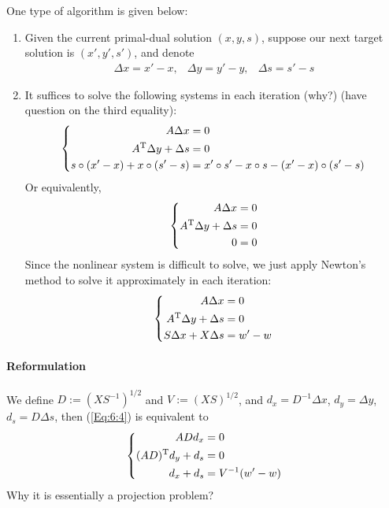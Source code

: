 One type of algorithm is given below:
\begin{enumerate}
\item
Given the current primal-dual solution $(x,y,s)$, suppose our next target solution is $(x',y',s')$, and denote
\[
\begin{array}{lll}
\Delta x=x'-x,
&
\Delta y = y'-y,
&
\Delta s = s'-s
\end{array}
\]
\item
It suffices to solve the following systems in each iteration (why?) (have question on the third equality):
\begin{equation}\label{Eq:6:4}
\begin{aligned}
\left\{
\begin{aligned}
A\Delta x&=0\\
A^{\mathrm T}\Delta y+\Delta s&=0\\
s\circ(x'-x)+x\circ(s'-s)&=x'\circ s' - x\circ s - (x'-x)\circ(s'-s)
\end{aligned}
\right.
\end{aligned}
\end{equation}
Or equivalently,
\begin{equation}
\begin{aligned}
\left\{
\begin{aligned}
A\Delta x&=0\\
A^{\mathrm T}\Delta y+\Delta s&=0\\
0&= 0
\end{aligned}
\right.
\end{aligned}
\end{equation}
Since the nonlinear system is difficult to solve, we just apply Newton's method to solve it approximately in each iteration:
\begin{equation}\label{Eq:6:4}
\begin{aligned}
\left\{
\begin{aligned}
A\Delta x&=0\\
A^{\mathrm T}\Delta y+\Delta s&=0\\
S\Delta x + X\Delta s&= w'-w
\end{aligned}
\right.
\end{aligned}
\end{equation}
\end{enumerate}
\paragraph{Reformulation}
We define $D:=(XS^{-1})^{1/2}$ and $V:=(XS)^{1/2}$, and $d_x = D^{-1}\Delta x$, $d_y = \Delta y$, $d_s = D\Delta s$, then (\ref{Eq:6:4}) is equivalent to 
\begin{equation}\label{Eq:6:7}
\left\{
\begin{aligned}
ADd_x&=0\\
(AD)^{\mathrm T} d_y+d_s &= 0\\
d_x+d_s&=V^{-1}(w'-w)
\end{aligned}
\right.
\end{equation}
Why it is essentially a projection problem?

